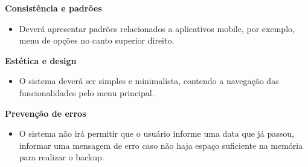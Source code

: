 \textbf{Consistência e padrões}
\begin{itemize}
	\item Deverá apresentar padrões relacionados a aplicativos mobile, por exemplo, menu de opções no canto superior direito.
\end{itemize}

\textbf{Estética e design}
\begin{itemize}
	\item O sistema deverá ser simples e minimalista, contendo a navegação das funcionalidades pelo menu principal.
\end{itemize}

\textbf{Prevenção de erros}
\begin{itemize}
	\item O sistema não irá permitir que o usuário informe uma data que já passou, informar uma mensagem de erro caso não haja espaço suficiente na memória para realizar o backup.
\end{itemize}